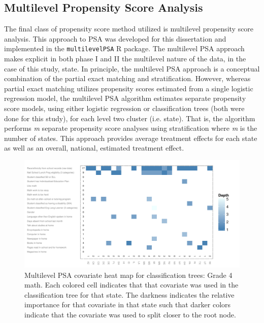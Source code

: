 \documentclass[letterpaper,12p,twoside]{article} %
\begin{document}
\subsection{Multilevel Propensity Score Analysis}

The final class of propensity score method utilized is multilevel propensity score analysis. This approach to PSA was developed for this dissertation and implemented in the \texttt{multilevelPSA} R package. The multilevel PSA approach makes explicit in both phase I and II the multilevel nature of the data, in the case of this study, state. In principle, the multilevel PSA approach is a conceptual combination of the partial exact matching and stratification. However, whereas partial exact matching utilizes propensity scores estimated from a single logistic regression model, the multilevel PSA algorithm estimates separate propensity score models, using either logistic regression or classification trees (both were done for this study), for each level two cluster (i.e. state). That is, the algorithm performs \textit{m} separate propensity score analyses using stratification where \textit{m} is the number of states. This approach provides average treatment effects for each state as well as an overall, national, estimated treatment effect.

\setlength{\belowcaptionskip}{-10pt}
\begin{figure}[t]
\begin{center}
\includegraphics[width=\textwidth]{../Figures2009/g4math-mlpsa-ctree-heat.pdf}
\caption[Multilevel PSA covariate heat map for classification trees: Grade 4 math]{Multilevel PSA covariate heat map for classification trees: Grade 4 math. Each colored cell indicates that that covariate was used in the classification tree for that state. The darkness indicates the relative importance for that covariate in that state such that darker colors indicate that the covariate was used to split closer to the root node.}
\label{fig:g4math-mlpsa-ctree-heat}
\end{center}
\end{figure}
\setlength{\belowcaptionskip}{0pt}
\end{document}
